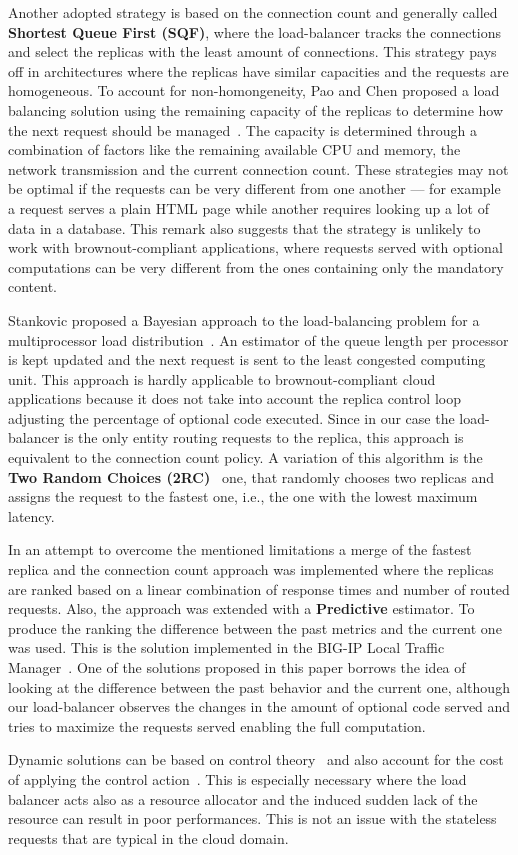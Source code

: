 Another adopted strategy is based on the connection count and
generally called \textbf{Shortest Queue First (SQF)}, where the
load-balancer tracks the connections and select the replicas with the
least amount of connections. This strategy pays off in architectures
where the replicas have similar capacities and the requests are
homogeneous. To account for non-homongeneity, Pao and Chen proposed a
load balancing solution using the remaining capacity of the replicas
to determine how the next request should be
managed~\cite{feedbackintensive}. The capacity is determined through a
combination of factors like the remaining available CPU and memory,
the network transmission and the current connection count.  These
strategies may not be optimal if the requests can be very different
from one another --- for example a request serves a plain HTML page
while another requires looking up a lot of data in a database. This
remark also suggests that the strategy is unlikely to work with
brownout-compliant applications, where requests served with optional
computations can be very different from the ones containing only the
mandatory content.

Stankovic proposed a Bayesian approach to the load-balancing problem
for a multiprocessor load distribution~\cite{Stankovic:TC}. An
estimator of the queue length per processor is kept updated and the
next request is sent to the least congested computing unit. This
approach is hardly applicable to brownout-compliant cloud applications
because it does not take into account the replica control loop
adjusting the percentage of optional code executed. Since in our case
the load-balancer is the only entity routing requests to the replica,
this approach is equivalent to the connection count policy. A
variation of this algorithm is the \textbf{Two Random Choices
  (2RC)}~\cite{2RC} one, that randomly chooses two replicas and
assigns the request to the fastest one, i.e., the one with the
lowest maximum latency.

In an attempt to overcome the mentioned limitations a merge of the
fastest replica and the connection count approach was implemented
where the replicas are ranked based on a linear combination of
response times and number of routed requests. Also, the approach was
extended with a \textbf{Predictive} estimator. To produce the ranking
the difference between the past metrics and the current one was
used. This is the solution implemented in the BIG-IP Local Traffic
Manager~\cite{BIGIP}. One of the solutions proposed in this paper
borrows the idea of looking at the difference between the past
behavior and the current one, although our load-balancer observes the
changes in the amount of optional code served and tries to maximize
the requests served enabling the full computation.

Dynamic solutions can be based on control
theory~\cite{multipathctlb,comparisonstaticdynamic} and also account
for the cost of applying the control action~\cite{costofcontrol}. This
is especially necessary where the load balancer acts also as a
resource allocator and the induced sudden lack of the resource can
result in poor performances. This is not an issue with the stateless
requests that are typical in the cloud domain.

